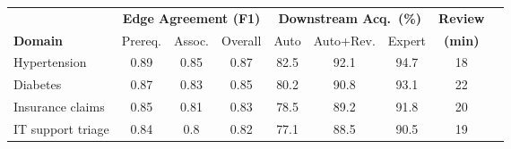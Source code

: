 \begin{tabular}{@{}lcccccccc@{}}
\toprule
& \multicolumn{3}{c}{\textbf{Edge Agreement (F1)}}
& \multicolumn{3}{c}{\textbf{Downstream Acq.\ (\%)}}
& \textbf{Review} \\
\cmidrule(lr){2-4}\cmidrule(lr){5-7}
\textbf{Domain} & Prereq. & Assoc. & Overall
  & Auto & Auto+Rev. & Expert & \textbf{(min)} \\
\midrule
Hypertension & 0.89 & 0.85 & 0.87 & 82.5 & 92.1 & 94.7 & 18 \\
Diabetes & 0.87 & 0.83 & 0.85 & 80.2 & 90.8 & 93.1 & 22 \\
Insurance claims & 0.85 & 0.81 & 0.83 & 78.5 & 89.2 & 91.8 & 20 \\
IT support triage & 0.84 & 0.8 & 0.82 & 77.1 & 88.5 & 90.5 & 19 \\
\bottomrule
\end{tabular}